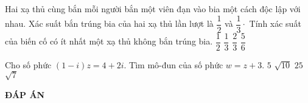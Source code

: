 \begin{ex}%
Hai xạ thủ cùng bắn mỗi người bắn một viên đạn vào bia một cách độc lập với nhau. Xác suất bắn trúng bia của hai xạ thủ lần lượt là $\dfrac{1}{2}$ và $\dfrac{1}{3}\cdot$ Tính xác suất của biến cố có ít nhất một xạ thủ không bắn trúng bia.
\choice
{$\dfrac{1}{2}$}
{$\dfrac{1}{3}$}
{$\dfrac{2}{3}$}
{\True $\dfrac{5}{6}$}
\end{ex}

\begin{ex}%
Cho số phức $(1-i)z=4+2i$. Tìm mô-đun của số phức $w=z+3$.
\choice
{\True $5$}
{$\sqrt{10}$}
{$25$}
{$\sqrt{7}$}
\end{ex}
\newpage
\begin{center}
	\textbf{ĐÁP ÁN}
\end{center}
\begin{multicols}{10}
	 
\end{multicols}